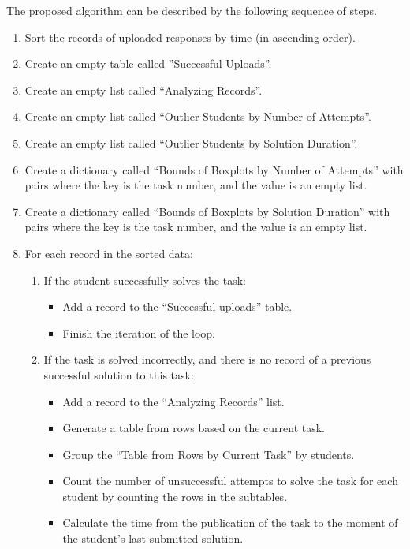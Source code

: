 \documentclass{article}
\begin{document}
\begin{multicols}{2}
\begin{justify}
      The proposed algorithm can be described by the following sequence of steps.
      \begin{enumerate}
        \item Sort the records of uploaded responses by time (in ascending order).
        \item Create an empty table called ”Successful Uploads”.
        \item Create an empty list called “Analyzing Records”.
        \item Create an empty list called “Outlier Students by Number of Attempts”.
        \item Create an empty list called “Outlier Students by Solution Duration”.
        \item Create a dictionary called “Bounds of Boxplots by Number of Attempts” with pairs where the key is the task number, and the value is an empty list.
        \item Create a dictionary called “Bounds of Boxplots by Solution Duration” with pairs where the key is the task number, and the value is an empty list.
        \item For each record in the sorted data:
        \begin{enumerate}[leftmargin=-2pt, itemindent=37pt]
          \item If the student successfully solves the task:
          \begin{itemize}[leftmargin=30pt, itemindent=0pt]
            \item Add a record to the “Successful uploads” table.
            \item	Finish the iteration of the loop.
          \end{itemize}
          \item If the task is solved incorrectly, and there is no record of a previous successful solution to this task:
          \begin{itemize}[leftmargin=30pt, itemindent=0pt]
            \item Add a record to the “Analyzing Records” list.
            \item Generate a table from rows based on the current task.
            \item Group the “Table from Rows by Current Task” by students.
            \item Count the number of unsuccessful attempts to solve the task for each student by counting the rows in the subtables.
            \item Calculate the time from the publication of the task to the moment of the student's last submitted solution.

\end{itemize}
\end{enumerate}
\end{enumerate}
\end{justify}
\end{multicols}
\end{document}
